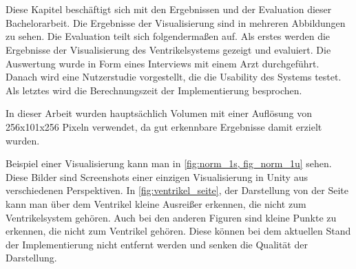 \chapter{}
\label{sec:results}





Diese Kapitel beschäftigt sich mit den Ergebnissen und der Evaluation dieser Bachelorarbeit. Die Ergebnisse der Visualisierung sind in mehreren Abbildungen zu sehen. Die Evaluation teilt sich folgendermaßen auf. Als erstes werden die Ergebnisse der Visualisierung des Ventrikelsystems gezeigt und evaluiert. Die Auswertung wurde in Form eines Interviews mit einem Arzt durchgeführt. Danach wird eine Nutzerstudie vorgestellt, die die Usability des Systems testet. Als letztes wird die Berechnungszeit der Implementierung besprochen.



In dieser Arbeit wurden hauptsächlich Volumen mit einer Auflösung von 256x101x256 Pixeln verwendet, da gut erkennbare Ergebnisse damit erzielt wurden.

Beispiel einer Visualisierung kann man in \autoref{fig:norm_1s, fig_norm_1u} sehen. Diese Bilder sind Screenshots einer einzigen Visualisierung in Unity aus verschiedenen Perspektiven. In \autoref{fig:ventrikel_seite}, der Darstellung von der Seite kann man über dem Ventrikel kleine Ausreißer erkennen, die nicht zum Ventrikelsystem gehören. Auch bei den anderen Figuren sind kleine Punkte zu erkennen, die nicht zum Ventrikel gehören. Diese können bei dem aktuellen Stand der Implementierung nicht entfernt werden und senken die Qualität der Darstellung. 



